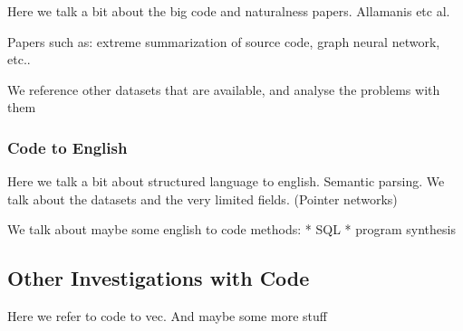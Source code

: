 Here we talk a bit about the big code and naturalness papers. Allamanis etc al.

Papers such as: extreme summarization of source code, graph neural network, etc..

We reference other datasets that are available, and analyse the problems with them


\subsubsection{Code to English} %
\label{ssub:code_to_english}

Here we talk a bit about structured language to english. Semantic parsing. We talk about the datasets and the very limited fields. (Pointer networks)

We talk about maybe some english to code methods:
* SQL
* program synthesis

\subsection{Other Investigations with Code} %
\label{sub:other_investigations_with_code}

Here we refer to code to vec.
And maybe some more stuff

\label{sec:related_work}







